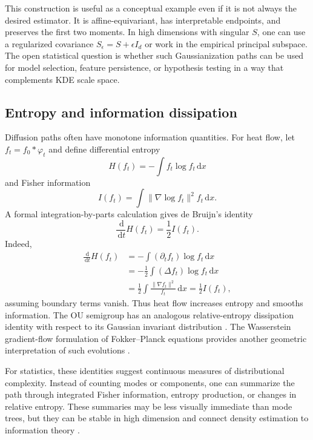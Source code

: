 \documentclass[preprint]{imsart}
\theoremstyle{plain}
\theoremstyle{definition}
\newcommand{\dd}{\,\mathrm{d}}
\begin{document}
This construction is useful as a conceptual example even if it is not always the desired estimator. It is affine-equivariant, has interpretable endpoints, and preserves the first two moments. In high dimensions with singular $S$, one can use a regularized covariance $S_\epsilon=S+\epsilon I_d$ or work in the empirical principal subspace. The open statistical question is whether such Gaussianization paths can be used for model selection, feature persistence, or hypothesis testing in a way that complements KDE scale space.

\subsection{Entropy and information dissipation}
\label{subsec:entropy}

Diffusion paths often have monotone information quantities. For heat flow, let $f_t=f_0*\varphi_t$ and define differential entropy
\[
  H(f_t)=-\int f_t\log f_t\dd x
\]
and Fisher information
\[
  I(f_t)=\int \|\nabla\log f_t\|^2 f_t\dd x.
\]
A formal integration-by-parts calculation gives de Bruijn's identity
\begin{equation*}
  \frac{\dd}{\dd t}H(f_t)=\frac12 I(f_t).
\end{equation*}
Indeed,
\begin{align*}
  \frac{\dd}{\dd t}H(f_t)
  &= -\int (\partial_t f_t)\log f_t\dd x \\
  &= -\frac12\int (\Delta f_t)\log f_t\dd x \\
  &= \frac12\int \frac{\|\nabla f_t\|^2}{f_t}\dd x
   = \frac12 I(f_t),
\end{align*}
assuming boundary terms vanish. Thus heat flow increases entropy and smooths information. The OU semigroup has an analogous relative-entropy dissipation identity with respect to its Gaussian invariant distribution  \citep{bakry_2014_AnalysisGeometryMarkov}. The Wasserstein gradient-flow formulation of Fokker--Planck equations provides another geometric interpretation of such evolutions \citep{jordan_1998_VariationalFormulationFokkerPlanck, villani_2009_OptimalTransportOld}.

For statistics, these identities suggest continuous measures of distributional complexity. Instead of counting modes or components, one can summarize the path through integrated Fisher information, entropy production, or changes in relative entropy. These summaries may be less visually immediate than mode trees, but they can be stable in high dimension and connect density estimation to information theory \citep{stam_1959_InequalitiesSatisfiedQuantities, cover_2005_ElementsInformationTheory}.
\end{document}
